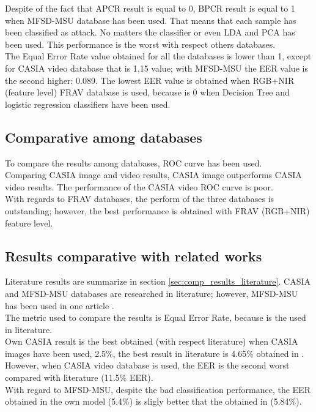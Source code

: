 Despite of the fact that APCR result is equal to 0, BPCR result is equal to 1 when MFSD-MSU database has been used. That means that each sample has been classified as attack. No matters the classifier or even LDA and PCA has been used. This performance is the worst with respect others databases.\\

The Equal Error Rate value obtained for all the databases is lower than 1, except for CASIA video database that is 1,15 value; with MFSD-MSU the EER value is the second higher: 0.089. The lowest EER value is obtained when RGB+NIR (feature level) FRAV database is used, because is 0 when Decision Tree and logistic regression classifiers have been used.

\subsection{Comparative among databases }
To compare the results among databases, ROC curve has been used.\\

Comparing CASIA image and video results, CASIA image outperforms CASIA video results. The performance of the CASIA video ROC curve is poor.\\

With regards to FRAV databases, the perform of the three databases is outstanding; however, the best performance is obtained with FRAV (RGB+NIR) feature level.

\subsection{Results comparative with related works}
Literature results are summarize in section \ref{sec:comp_results_literature}. CASIA and MFSD-MSU databases are researched in literature; however, MFSD-MSU has been used in one article \cite{MSUdatabse}.\\

The metric used to compare the results is Equal Error Rate, because is the used in literature.\\

Own CASIA result is the best obtained (with respect literature) when CASIA images have been used, 2.5\%, the best result in literature is 4.65\% obtained in \cite{yangLL14}. However, when CASIA video database is used, the EER is the second worst compared with literature (11.5\% EER).\\

With regard to MFSD-MSU, despite the bad classification performance, the EER obtained in the own model (5.4\%) is sligly better that the obtained in \cite{MSUdatabse} (5.84\%).